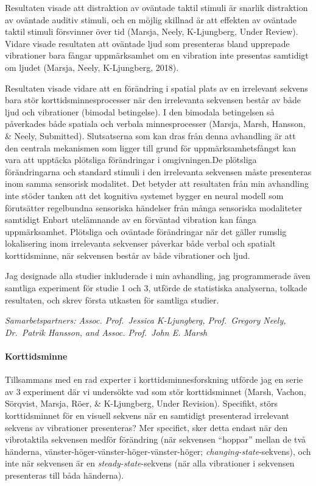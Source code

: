 \documentclass[]{article}
\begin{document}
Resultaten visade att distraktion av oväntade taktil stimuli är snarlik
distraktion av oväntade auditiv stimuli, och en möjlig skillnad är att
effekten av oväntade taktil stimuli försvinner över tid (Marsja, Neely,
K-Ljungberg, Under Review). Vidare visade resultaten att oväntade ljud
som presenteras bland upprepade vibrationer bara fångar uppmärksamhet om
en vibration inte presentas samtidigt om ljudet (Marsja, Neely,
K-Ljungberg, 2018).

Resultaten visade vidare att en förändring i spatial plats av en
irrelevant sekvens bara stör korttidsminnesprocesser när den irrelevanta
sekvensen består av både ljud och vibrationer (bimodal betingelse). I
den bimodala betingelsen så påverkades både spatiala och verbala
minnesprocesser (Marsja, Marsh, Hansson, \& Neely, Submitted).
Slutsatserna som kan dras från denna avhandling är att den centrala
mekanismen som ligger till grund för uppmärksamhetsfångst kan vara att
upptäcka plötsliga förändringar i omgivningen.De plötsliga
förändringarna och standard stimuli i den irrelevanta sekvensen måste
presenteras inom samma sensorisk modalitet. Det betyder att resultaten
från min avhandling inte stöder tanken att det kognitiva systemet bygger
en neural modell som förutsätter regelbundna sensoriska händelser från
många sensoriska modaliteter samtidigt Enbart utelämnande av en
förväntad vibration kan fånga uppmärksamhet. Plötsliga och oväntade
förändringar när det gäller rumslig lokalisering inom irrelevanta
sekvenser påverkar både verbal och spatialt korttidsminne, när sekvensen
består av både vibrationer och ljud.

Jag designade alla studier inkluderade i min avhandling, jag
programmerade även samtliga experiment för studie 1 och 3, utförde de
statistiska analyserna, tolkade resultaten, och skrev första utkasten
för samtliga studier.

\emph{Samarbetspartners: Assoc. Prof.~Jessica K-Ljungberg, Prof.~Gregory
Neely, Dr.~Patrik Hansson, and Assoc. Prof.~John E. Marsh}

\paragraph{Korttidsminne}\label{korttidsminne}

Tillsammans med en rad experter i korttidsminnesforskning utförde jag en
serie av 3 experiment där vi undersökte vad som stör korttidsminnet
(Marsh, Vachon, Sörqvist, Marsja, Röer, \& K-Ljungberg, Under Revision).
Specifikt, störs korttidsminnet för en visuell sekvens när en samtidigt
presenterad irrelevant sekvens av vibrationer presenteras? Mer
specifict, sker detta endast när den vibrotaktila sekvensen medför
förändring (när sekvensen ``hoppar'' mellan de två händerna,
vänster-höger-vänster-höger-vänster-höger;
\emph{changing-state}-sekvens), och inte när sekvensen är en
\emph{steady-state}-sekvens (när alla vibrationer i sekvensen
presenteras till båda händerna).
\end{document}
